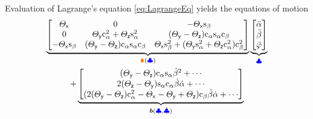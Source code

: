 Evaluation of Lagrange's equation \eqref{eq:LagrangeEq} yields the equations of motion 
\begin{multline}\label{eq:LagrangeEqRBAttitude}
 \underbrace{\begin{bmatrix}
  \Jx & 0 & -\Jx \spit \\
  0 & \Jy\crol^2 + \Jz\srol^2 & (\Jy-\Jz)\crol\srol\cpit \\
  -\Jx \spit & (\Jy-\Jz)\crol\srol\cpit & \Jx\spit^2 + (\Jy\srol^2 + \Jz\crol^2)\cpit^2 
 \end{bmatrix}}_{\sysInertiaMat(\genCoord)}
 \underbrace{\begin{bmatrix} \roldd \\ \pitdd \\ \yawdd \end{bmatrix}}_{\genCoorddd}
\\
 + \underbrace{\begin{bmatrix}
  (\Jy-\Jz)\crol\srol \pitd^2 + \cdots \\ %
  2(\Jz-\Jy)\srol\crol\pitd \rold + \cdots \\ %
  (2(\Jy-\Jz)\crol^2 - \Jx - \Jy + \Jz)\cpit \pitd \rold + \cdots \\ %
 \end{bmatrix}}_{\sysForce(\genCoord, \genCoordd)}

\end{multline}
